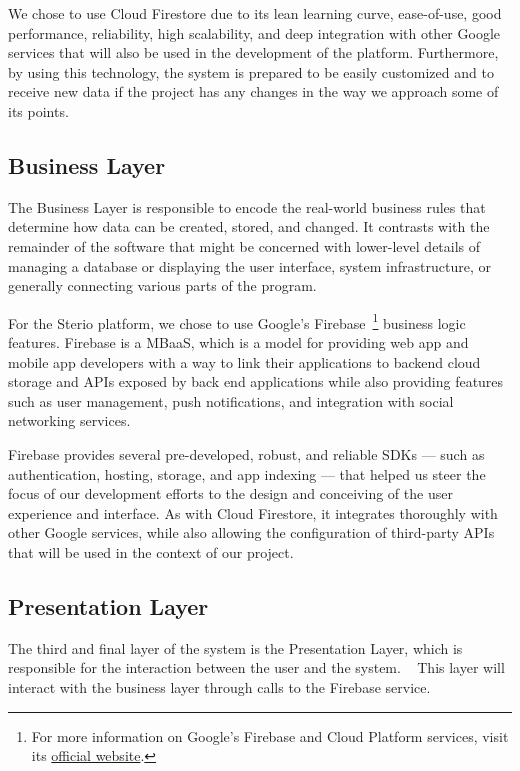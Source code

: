 We chose to use Cloud Firestore due to its lean learning curve, ease-of-use, good performance, reliability, high scalability, and deep integration with other Google services that will also be used in the development of the platform. Furthermore, by using this technology, the system is prepared to be easily customized and to receive new data if the project has any changes in the way we approach some of its points.


\subsection{Business Layer}

The Business Layer is responsible to encode the real-world business rules that determine how data can be created, stored, and changed. It contrasts with the remainder of the software that might be concerned with lower-level details of managing a database or displaying the user interface, system infrastructure, or generally connecting various parts of the program. ~\cite{Aarsten}

For the Sterio platform, we chose to use Google's Firebase~\footnote{For more information on Google's Firebase and Cloud Platform services, visit its \href{https://firebase.google.com/}{official website}.} business logic features. Firebase is a \ac{MBaaS}, which is a model for providing web app and mobile app developers with a way to link their applications to backend cloud storage and \acp{API} exposed by back end applications while also providing features such as user management, push notifications, and integration with social networking services.

Firebase provides several pre-developed, robust, and reliable \acp{SDK} — such as authentication, hosting, storage, and app indexing — that helped us steer the focus of our development efforts to the design and conceiving of the user experience and interface. As with Cloud Firestore, it integrates thoroughly with other Google services, while also allowing the configuration of third-party \acp{API} that will be used in the context of our project.


\subsection{Presentation Layer}

The third and final layer of the system is the Presentation Layer, which is responsible for the interaction between the user and the system. ~\cite{Aarsten} This layer will interact with the business layer through calls to the Firebase service.

